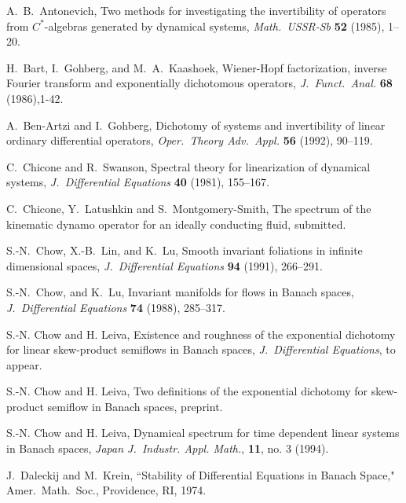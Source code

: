 \begin{thebibliography}{99}

 A.~B.~Antonevich,
Two methods for investigating the invertibility of operators from
$C^*$-algebras generated by dynamical systems,
{\em Math.~USSR-Sb}
{\bf 52} (1985), 1--20.

H.~Bart, I.~Gohberg, and M.~A.~Kaashoek,
 Wiener-Hopf factorization,
inverse Fourier transform and
exponentially dichotomous operators,
{\em J.~Funct.~Anal.}
{\bf  68} (1986),1-42.

 A.~Ben-Artzi and I.~Gohberg,
 Dichotomy of systems and
invertibility of linear ordinary
differential operators,
{\em Oper.~Theory Adv.~Appl.}
{\bf  56} (1992), 90--119.


 C.~Chicone and R.~Swanson,
 Spectral theory for linearization of dynamical systems,
{\em J.~Differential Equations}
{\bf 40} (1981), 155--167.

 C.~Chicone, Y.~Latushkin and S.~Montgomery-Smith,
 The spectrum of the kinematic dynamo operator for an ideally
conducting fluid,  submitted.

 S.-N.~Chow, X.-B.~Lin, and K.~Lu,
 Smooth invariant foliations in infinite dimensional spaces,
{\em J.~Differential Equations}
{\bf 94} (1991), 266--291.

 S.-N.~Chow, and K.~Lu,
 Invariant manifolds for flows in Banach spaces,
{\em J.~Differential Equations}
{\bf 74} (1988), 285--317.

 S.-N. Chow and H. Leiva,
 Existence and roughness of the exponential dichotomy for
linear skew-product semiflows in Banach spaces,
{\em J.~Differential Equations},
to appear.

 S.-N. Chow and H. Leiva,
 Two definitions of the exponential dichotomy for
 skew-product semiflow in Banach spaces,
preprint.

 S.-N. Chow and H. Leiva,
Dynamical spectrum for time dependent linear systems in Banach spaces,
{\em Japan J.~Industr. Appl. Math.}, {\bf 11}, no. 3 (1994).


 J.~Daleckij and M.~Krein,
``Stability of Differential Equations in Banach Space,"
Amer.~Math.~Soc., Providence, RI, 1974.


\end{thebibliography}
